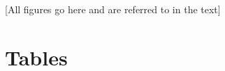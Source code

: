 \documentclass[english]{article}
\begin{document}

[All figures go here and are referred to in the text]

\section*{Tables}





\end{document}
